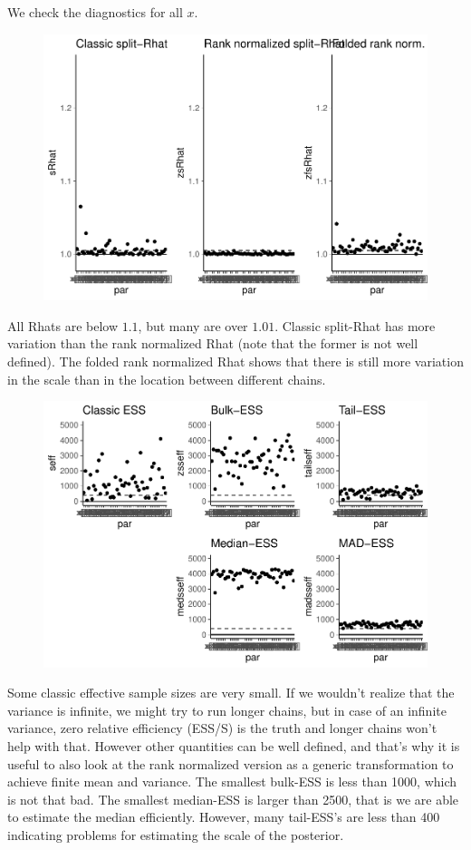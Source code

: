 \documentclass[american,]{article}
\begin{document}
We check the diagnostics for all \(x\).

\begin{figure}[tp]
  \centering
  \includegraphics[width=0.6\linewidth]{graphics/rhat-fit-nom-td20-1.pdf}
\end{figure}

All Rhats are below \(1.1\), but many are over \(1.01\). Classic
split-Rhat has more variation than the rank normalized Rhat (note that
the former is not well defined). The folded rank normalized Rhat shows
that there is still more variation in the scale than in the location
between different chains.

\begin{figure}[tp]
  \centering
  \includegraphics[width=0.6\linewidth]{graphics/ess-fit-nom-td20-1.pdf}
\end{figure}

Some classic effective sample sizes are very small. If we wouldn't
realize that the variance is infinite, we might try to run longer
chains, but in case of an infinite variance, zero relative efficiency
(ESS/S) is the truth and longer chains won't help with that. However
other quantities can be well defined, and that's why it is useful to
also look at the rank normalized version as a generic transformation to
achieve finite mean and variance. The smallest bulk-ESS is less than
1000, which is not that bad. The smallest median-ESS is larger than
2500, that is we are able to estimate the median efficiently. However,
many tail-ESS's are less than 400 indicating problems for estimating the
scale of the posterior.
\end{document}
